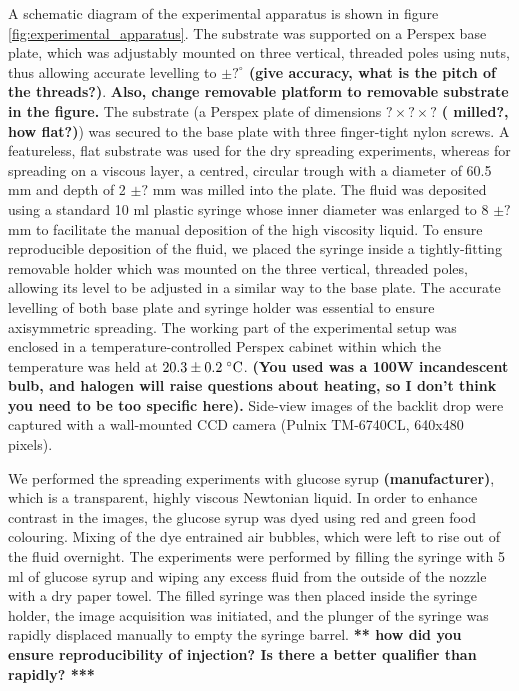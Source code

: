 \documentclass[aip,graphicx]{revtex4-1}
\begin{document}
A schematic diagram of the experimental apparatus is
shown in figure \ref{fig:experimental_apparatus}.  The substrate was
supported on a Perspex base plate, which was adjustably mounted on
three vertical, threaded poles using nuts, thus allowing accurate
levelling to {\bf $\pm ?^\circ$ (give accuracy, what is the pitch of
  the threads?)}. {\bf Also, change removable platform to removable
  substrate in the figure.} The substrate (a Perspex plate of
dimensions {\bf $? \times ? \times ?$} {\bf( milled?, how flat?)})
was secured to the base plate with three finger-tight nylon screws. A
featureless, flat substrate was used for the dry spreading
experiments, whereas for spreading on a viscous layer, a centred,
circular trough with a diameter of 60.5 mm and depth of 2 {\bf $\pm
  ?$} mm was milled into the plate.  The fluid was deposited using a
standard 10 ml plastic syringe whose inner diameter was enlarged 
to 8 {\bf $\pm ?$} mm to facilitate the manual deposition of the high
viscosity liquid. To ensure reproducible deposition of the
fluid, we placed the syringe inside a tightly-fitting removable
holder which was mounted on the three vertical, threaded poles, 
allowing its level to be adjusted in a similar way to the base plate. The
accurate levelling of both base plate and syringe holder was essential
to ensure axisymmetric spreading. The working part of the experimental 
setup was enclosed in a temperature-controlled Perspex cabinet within which the 
temperature was held at $20.3 \pm 0.2 \; ^{\circ} \text{C}$.
{\bf (You used was a 100W incandescent bulb, and halogen will raise
  questions about heating, so I don't think you need to be too
  specific here).}
Side-view images of the backlit drop were captured with a wall-mounted 
CCD camera (Pulnix TM-6740CL, 640x480 pixels). 

We performed the spreading experiments with glucose syrup {\bf
  (manufacturer)}, which is a transparent, highly viscous Newtonian
liquid. In order to enhance contrast in the images, the glucose syrup
was dyed using red and green food colouring.  Mixing of the dye
entrained air bubbles, which were left to rise out of the fluid
overnight. The experiments were performed by filling the syringe with
5 ml of glucose syrup and wiping any excess fluid from the outside of
the nozzle with a dry paper towel. The filled syringe was then placed
inside the syringe holder, the image acquisition was initiated, and
the plunger of the syringe was rapidly displaced manually to empty the
syringe barrel. {\bf  *** how did you ensure reproducibility of injection? Is there a better qualifier than rapidly? ***}
\end{document}
